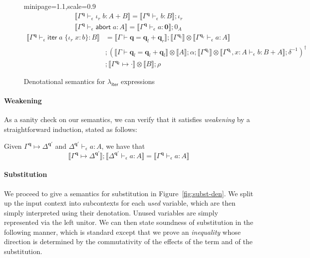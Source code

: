 \documentclass[acmsmall,screen,anonymous,review]{acmart}
\newcommand{\mb}[1]{\ensuremath{\mathbf{#1}}}
\newcommand{\ms}[1]{\ensuremath{\mathsf{#1}}}
\newcommand{\lto}{:}
\newcommand{\linr}[1]{\iota_r\;{#1}}
\newcommand{\labort}[1]{\ms{abort}\;{#1}}
\newcommand{\liter}[3]{\ms{iter}\;#1\;\{ \linr{#2} \lto #3 \}}
\newcommand{\qsp}[4]{#1 \vdash #2 = #3 + #4}
\newcommand{\cwk}[2]{#1 \mapsto #2}
\newcommand{\hasty}[4]{#1 \vdash_{#2} #3: {#4}}
\newcommand{\dnt}[1]{\llbracket{#1}\rrbracket}
\newcommand{\subiterexp}{\texorpdfstring{\(\lambda_{\ms{iter}}\)}{lambda-iter}}
\begin{document}
\begin{figure}
\begin{adjustbox}{minipage=1.1\textwidth,scale=0.9}
\begin{gather*}
    \dnt{\hasty{\Gamma^{\mb{q}}}{\epsilon}{\linr{b}}{A + B}}
    = \dnt{\hasty{\Gamma^{\mb{q}}}{\epsilon}{b}{B}} ; \iota_r \\
    \dnt{\hasty{\Gamma^{\mb{q}}}{\epsilon}{\labort{a}}{A}}
    = \dnt{\hasty{\Gamma^{\mb{q}}}{\epsilon}{a}{\mb{0}}} ; 0_A
  \end{gather*}
  \begin{align*}
    \dnt{\hasty{\Gamma^{\mb{q}}}{\epsilon}{\liter{a}{x}{b}}{B}}
    &= 
    \dnt{\qsp{\Gamma}{\mb{q}}{\mb{q}_l}{\mb{q}_r}}
    ; \dnt{\Gamma^{\mb{q}_l}}
      \otimes \dnt{\hasty{\Gamma^{\mb{q}_r}}{\epsilon}{a}{A}} \\ &
    ; (
      \dnt{\qsp{\Gamma}{\mb{q}_l}{\mb{q}_l}{\mb{q}_l}} \otimes \dnt{A} 
      ; \alpha
      ; \dnt{\Gamma^{\mb{q}_l}} 
        \otimes \dnt{\hasty{\Gamma^{\mb{q}_l}, x : A}{\epsilon}{b}{B + A}}
      ; \delta^{-1}
    )^\dagger \\ &
    ; \dnt{\cwk{\Gamma^{\mb{q}_l}}{\cdot}} \otimes \dnt{B}
    ; \rho
  \end{align*}
  \end{adjustbox}
  \caption{Denotational semantics for \subiterexp{} expressions}
  \Description{}
  \label{fig:expr-densem}
\end{figure}

\paragraph{Weakening}

As a sanity check on our semantics, we can verify that it satisfies \emph{weakening} by a
straightforward induction, stated as follows:
\begin{lemma}[Weakening]
  Given $\cwk{\Gamma^{\mb{q}}}{\Delta^{\mb{q}'}}$ and
  $\hasty{\Delta^{\mb{q}'}}{\epsilon}{a}{A}$, we have that
  $$
  \dnt{\cwk{\Gamma^{\mb{q}}}{\Delta^{\mb{q}'}}} ; \dnt{\hasty{\Delta^{\mb{q}'}}{\epsilon}{a}{A}}
  = \dnt{\hasty{\Gamma^{\mb{q}}}{\epsilon}{a}{A}}
  $$
\end{lemma}

\paragraph{Substitution}

We proceed to give a semantics for substitution in Figure~\ref{fig:subst-den}. We split up the input
context into subcontexts for each \emph{used} variable, which are then simply interpreted using
their denotation. Unused variables are simply represented via the left unitor. We can then state
soundness of substitution in the following manner, which is standard except that we prove an
\emph{inequality} whose direction is determined by the commutativity of the effects of the term and
of the substitution. 
\end{document}
